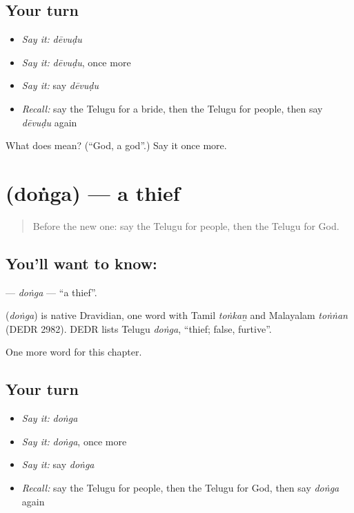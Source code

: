 \subsection*{Your turn}
\begin{itemize}
\raggedright
  \item \emph{Say it:} \emph{dēvuḍu}
  \item \emph{Say it:} \emph{dēvuḍu}, once more
  \item \emph{Say it:} say \emph{dēvuḍu}
  \item \emph{Recall:} say the Telugu for a bride, then the Telugu for people, then say \emph{dēvuḍu} again
\end{itemize}

\begin{tcolorbox}[breakable,colback=teal!4,colframe=teal!35!black,title={Before you move on}]
What does  mean? (\textquotedblleft{}God, a god\textquotedblright{}.) Say it once more.
\end{tcolorbox}
\section[\texorpdfstring{\te{దొంగ} (doṅga)}{దొంగ (doṅga)}]{ (doṅga) — a thief}

\label{lesson:TE-C265-donga}



\begin{quote}
Before the new one: say the Telugu for people, then the Telugu for God.
\end{quote}

\subsection*{You'll want to know: }
\textbf{} — \emph{doṅga} — \textquotedblleft{}a thief\textquotedblright{}.

\begin{cousinweb}
\textbf{} (\emph{doṅga}) is native Dravidian, one word with Tamil \emph{toṅkaṉ} and Malayalam \emph{toṅṅan} (DEDR 2982). DEDR lists Telugu \emph{doṅga}, \textquotedblleft{}thief; false, furtive\textquotedblright{}.
\end{cousinweb}

\begin{grammarlens}[title={What you've built}]
One more word for this chapter.
\end{grammarlens}

\subsection*{Your turn}
\begin{itemize}
\raggedright
  \item \emph{Say it:} \emph{doṅga}
  \item \emph{Say it:} \emph{doṅga}, once more
  \item \emph{Say it:} say \emph{doṅga}
  \item \emph{Recall:} say the Telugu for people, then the Telugu for God, then say \emph{doṅga} again
\end{itemize}


